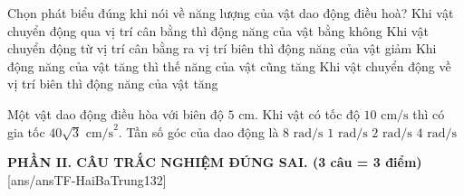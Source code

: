\begin{ex}	Chọn phát biểu đúng khi nói về năng lượng của vật dao động điều hoà?
	\choice
	{Khi vật chuyển động qua vị trí cân bằng thì động năng của vật bằng không}
	{\True Khi vật chuyển động từ vị trí cân bằng ra vị trí biên thì động năng của vật giảm}
	{Khi động năng của vật tăng thì thế năng của vật cũng tăng}
	{Khi vật chuyển động về vị trí biên thì động năng của vật tăng}
\end{ex}

\begin{ex}	Một vật dao động điều hòa với biên độ $5\text{ cm}$. Khi vật có tốc độ $10\text{ cm/s}$ thì có gia tốc $40\sqrt{3}\text{ cm/s}^2$. Tần số góc của dao động là
	\choice
	{$8\text{ rad/s}$}
	{$1\text{ rad/s}$}
	{$2\text{ rad/s}$}
	{\True $4\text{ rad/s}$}
\end{ex}


\noindent \textbf{PHẦN II. CÂU TRẮC NGHIỆM ĐÚNG SAI. (3 câu = 3 điểm)}
[ans/ansTF-HaiBaTrung132]

